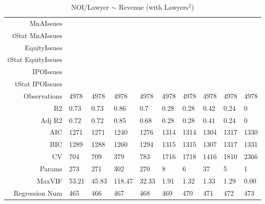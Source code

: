 \begin{table}[ht]
\begin{tabular}{rlllllllll}
  MnAIssues &  &  &  &  &  &  &  &  &  \\ 
  tStat MnAIssues &  &  &  &  &  &  &  &  &  \\ 
  EquityIssues &  &  &  &  &  &  &  &  &  \\ 
  tStat EquityIssues &  &  &  &  &  &  &  &  &  \\ 
  IPOIssues &  &  &  &  &  &  &  &  &  \\ 
  tStat IPOIssues &  &  &  &  &  &  &  &  &  \\ 
  Observations & 4978 & 4978 & 4978 & 4978 & 4978 & 4978 & 4978 & 4978 & 4978 \\ 
  R2 & 0.73 & 0.73 & 0.86 & 0.7 & 0.28 & 0.28 & 0.42 & 0.24 & 0 \\ 
  Adj R2 & 0.72 & 0.72 & 0.85 & 0.68 & 0.28 & 0.28 & 0.41 & 0.24 & 0 \\ 
  AIC & 1271 & 1271 & 1240 & 1276 & 1314 & 1314 & 1304 & 1317 & 1330 \\ 
  BIC & 1289 & 1288 & 1260 & 1294 & 1315 & 1315 & 1307 & 1317 & 1331 \\ 
  CV & 704 & 709 & 379 & 783 & 1716 & 1718 & 1416 & 1810 & 2366 \\ 
  Params & 273 & 271 & 302 & 270 & 8 & 6 & 37 & 5 & 1 \\ 
  MaxVIF & 53.21 & 45.83 & 118.47 & 32.33 & 1.91 & 1.32 & 1.33 & 1.29 & 0.00 \\ 
  Regression Num & 465 & 466 & 467 & 468 & 469 & 470 & 471 & 472 & 473 \\ 
   \hline
\end{tabular}
\caption{NOI/Lawyer $\sim$ Revenue (with Lawyers$^2$)} 
\end{table}
